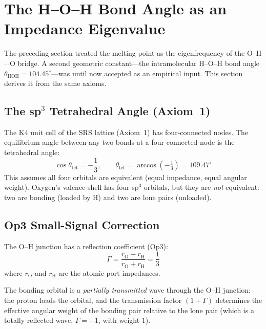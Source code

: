 
\section{The H--O--H Bond Angle as an Impedance Eigenvalue}
\label{sec:bond_angle_derivation}

The preceding section treated the melting point as the eigenfrequency of the 
O--H$\cdots$O bridge. A second geometric constant---the intramolecular 
H--O--H bond angle $\theta_\text{HOH} = 104.45^{\circ}$---was until now accepted 
as an empirical input. This section derives it from the same axioms.

\subsection{The sp$^3$ Tetrahedral Angle (Axiom~1)}

The K4 unit cell of the SRS lattice (Axiom~1) has four-connected nodes. 
The equilibrium angle between any two bonds at a four-connected node is the 
tetrahedral angle:
\begin{equation}
  \cos\theta_\text{tet} = -\frac{1}{3}, \qquad 
  \theta_\text{tet} = \arccos\!\left(-\tfrac{1}{3}\right) = 109.47^{\circ}
  \label{eq:theta_tet}
\end{equation}
This assumes all four orbitals are equivalent (equal impedance, equal angular 
weight). Oxygen's valence shell has four sp$^3$ orbitals, but they are 
\emph{not} equivalent: two are bonding (loaded by H) and two are lone pairs 
(unloaded).

\subsection{Op3 Small-Signal Correction}

The O--H junction has a reflection coefficient (Op3):
\begin{equation}
  \Gamma = \frac{r_\text{O} - r_\text{H}}{r_\text{O} + r_\text{H}} = \frac{1}{3}
  \label{eq:Gamma_OH}
\end{equation}
where $r_\text{O}$ and $r_\text{H}$ are the atomic port impedances.

The bonding orbital is a \emph{partially transmitted} wave through the O--H 
junction: the proton loads the orbital, and the transmission factor $(1 + \Gamma)$ 
determines the effective angular weight of the bonding pair relative to the 
lone pair (which is a totally reflected wave, $\Gamma = -1$\gammaundeclared{}, with weight $1$).

